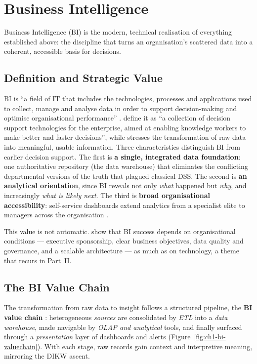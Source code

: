 \section{Business Intelligence}
\label{sec:ch1-bi}

Business Intelligence (BI) is the modern, technical realisation of everything established above: the
discipline that turns an organisation's scattered data into a coherent, accessible basis for decisions.

\subsection{Definition and Strategic Value}

BI is ``a field of IT that includes the technologies, processes and applications used to collect,
manage and analyse data in order to support decision-making and optimise organisational performance''
\parencite{abbas2024bi}. \textcite{chaudhuri2011} define it as ``a collection of decision support
technologies for the enterprise, aimed at enabling knowledge workers to make better and faster
decisions'', while \textcite{negash2004} stresses the transformation of raw data into meaningful,
usable information. Three characteristics distinguish BI from earlier decision support. The first is
\textbf{a single, integrated data foundation}: one authoritative repository (the data warehouse) that
eliminates the conflicting departmental versions of the truth that plagued classical DSS. The second is
\textbf{an analytical orientation}, since BI reveals not only \emph{what} happened but \emph{why}, and
increasingly \emph{what is likely next}. The third is \textbf{broad organisational accessibility}:
self-service dashboards extend analytics from a specialist elite to managers across the organisation
\parencite{sharda2020}.

This value is not automatic. \textcite{yeoh2010} show that BI success depends on organisational
conditions --- executive sponsorship, clear business objectives, data quality and governance, and a
scalable architecture --- as much as on technology, a theme that recurs in Part~II.

\subsection{The BI Value Chain}

The transformation from raw data to insight follows a structured pipeline, the \textbf{BI value chain}
\parencite{chaudhuri2011}: heterogeneous \emph{sources} are consolidated by \emph{ETL} into a
\emph{data warehouse}, made navigable by \emph{OLAP and analytical} tools, and finally surfaced through
a \emph{presentation} layer of dashboards and alerts (Figure~\ref{fig:ch1-bi-valuechain}). With each
stage, raw records gain context and interpretive meaning, mirroring the DIKW ascent.

